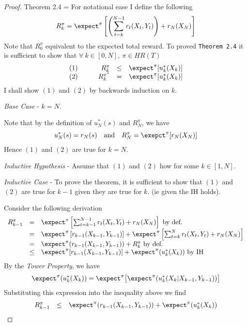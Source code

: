 \documentclass[11pt,a4paper]{article}
\begin{document}
  \begin{proof}{Theorem 2.4}
    \everymath={\displaystyle}
    For notational ease I define the following
    \[ R_k^\pi=\expect^\pi\left[\left(\sum_{t=k}^{N-1}r_t(X_t,Y_t)\right)+r_N(X_N)\right] \]
    Note that $R_0^\pi$ equivalent to the expected total reward. To proved \texttt{Theorem 2.4}  it is sufficient to show that $\forall\ k\in[0,N],\ \pi\in HR(T)$
    \[\begin{array}{rcrcl}
      (1)&\quad&R_k^\pi&\leq&\expect^\pi[u_k^*(X_k)]\\
      (2)&\quad&R_k^{\pi^*}&=&\expect^\pi[u_k^*(X_k)]
    \end{array}\]
    I shall show $(1)$ and $(2)$ by backwards induction on $k$.
    \\
    \par \textit{Base Case} - $k=N$.
    \par Note that by the definition of $u_N^*(s)$ and $R_N^\pi$, we have
    \[ u_N^*(s)=r_N(s)\quad\text{and}\quad R_N^\pi=\exepct^\pi[r_N(X_N)] \]
    Hence $(1)$ and $(2)$ are true for $k=N$.
    \\
    \par \textit{Inductive Hypothesis} - Assume that $(1)$ and $(2)$ how for some $k\in[1,N]$.
    \\
    \par \textit{Inductive Case} - To prove the theorem, it is sufficient to show that $(1)$ and $(2)$ are true for $k-1$ given they are true for $k$. (ie given the IH holds).
    \par Consider the following derivation
    \[\begin{array}{rcl}
      R_{k-1}^\pi&=&\expect^\pi\left[\sum_{t=k-1}^{N-1}r_t(X_t,Y_t)+r_N(X_N)\right]\text{ by def.}\\
      &=&\expect^\pi\left[r_{k-1}(X_{k-1},Y_{k-1})\right]+\expect^\pi\left[\sum_{t=k}^Nr_t(X_t,Y_t)+r_N(X_N)\right]\\
      &=&\expect^\pi(r_{k-1}(X_{k-1},Y_{k-1}))+R_k^\pi\text{ by def.}\\
      &\leq&\expect^\pi[r_{k-1}(X_{k-1},Y_{k-1})]+\expect^\pi(u_k^*(X_k))\text{ by IH}
    \end{array}\]
    By the \textit{Tower Property}, we have
    \[ \expect^\pi(u_k^*(X_k))=\expect^\pi\big[\expect^\pi(u_k^*(X_k|X_{k-1},Y_{k-1}))\big] \]
    Substituting this expression into the inequality above we find
    \[\begin{array}{rcl}
      R_{k-1}^\pi&\leq&\expect^\pi(r_{k-1}(X_{k-1},Y_{k-1}))+\expect^\pi(u_k^*(X_k))\\

\end{array}\]
\end{proof}
\end{document}
